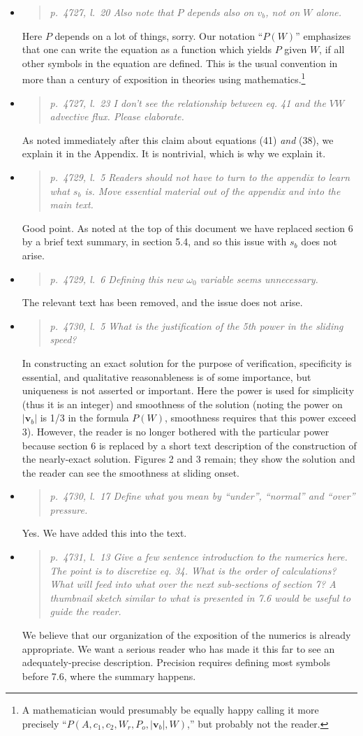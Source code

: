 \documentclass[11pt,reqno]{amsart}
\newcommand{\reply}[2]{
\medskip\medskip
\item  \begin{quote}
\emph{#1}
\end{quote}

\medskip
\noindent #2}
\begin{document}
\begin{itemize}
\reply{p.~4727, l.~20 Also note that $P$ depends also on $v_b$, not on $W$ alone.}
{Here $P$ depends on a lot of things, sorry.  Our notation ``$P(W)$'' emphasizes that one can write the equation as a function which yields $P$ given $W$, if all other symbols in the equation are defined.  This is the usual convention in more than a century of exposition in theories using mathematics.\footnote{A mathematician would presumably be equally happy calling it more precisely ``$P(A,c_1,c_2,W_r,P_o,|\mathbf{v}_b|,W)$,'' but probably not the reader.}}

\reply{p.~4727, l.~23 I don’t see the relationship between eq. 41 and the $VW$ advective flux.  Please elaborate.}
{As noted immediately after this claim about equations (41) \emph{and} (38), we explain it in the Appendix.  It is nontrivial, which is why we explain it.}

\reply{p.~4729, l.~5 Readers should not have to turn to the appendix to learn what $s_b$ is. Move essential material out of the appendix and into the main text.}
{Good point.  As noted at the top of this document we have replaced section 6 by a brief text summary, in section 5.4, and so this issue with $s_b$ does not arise.}

\reply{p.~4729, l.~6 Defining this new $\omega_0$ variable seems unnecessary.}
{The relevant text has been removed, and the issue does not arise.}

\reply{p.~4730, l.~5 What is the justification of the 5th power in the sliding speed?}
{In constructing an exact solution for the purpose of verification, specificity is essential, and qualitative reasonableness is of some importance, but uniqueness is not asserted or important.  Here the power is used for simplicity (thus it is an integer) and smoothness of the solution (noting the power on $|\mathbf{v}_b|$ is 1/3 in the formula $P(W)$, smoothness requires that this power exceed 3).  However, the reader is no longer bothered with the particular power because section 6 is replaced by a short text description of the construction of the nearly-exact solution.  Figures 2 and 3 remain; they show the solution and the reader can see the smoothness at sliding onset.}

\reply{p.~4730, l.~17 Define what you mean by ``under'', ``normal'' and ``over'' pressure.}
{Yes.  We have added this into the text.}

\reply{p.~4731, l.~13 Give a few sentence introduction to the numerics here. The point is to
discretize eq. 34. What is the order of calculations? What will feed into what over the
next sub-sections of section 7? A thumbnail sketch similar to what is presented in 7.6
would be useful to guide the reader.}
{We believe that our organization of the exposition of the numerics is already appropriate.  We want a serious reader who has made it this far to see an adequately-precise description.  Precision requires defining most symbols before 7.6, where the summary happens.}


\end{itemize}
\end{document}
